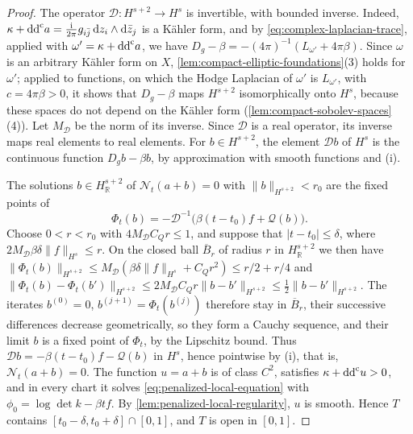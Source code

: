 \begin{proof}
The operator $\mathcal D\colon H^{s+2}\to H^s$ is invertible, with bounded inverse. Indeed, $\kappa+\mathrm{dd}^{\mathrm{c}} a=\frac{\mathrm i}{2\pi}g_{i\bar j}\,\mathrm dz_i\wedge\mathrm d\bar z_j$ is a K\"ahler form, and by \eqref{eq:complex-laplacian-trace}, applied with $\omega'=\kappa+\mathrm{dd}^{\mathrm{c}} a$, we have $D_g-\beta=-(4\pi)^{-1}(L_{\omega'}+4\pi\beta)$. Since $\omega$ is an arbitrary K\"ahler form on $X$, \cref{lem:compact-elliptic-foundations}(3) holds for $\omega'$; applied to functions, on which the Hodge Laplacian of $\omega'$ is $L_{\omega'}$, with $c=4\pi\beta>0$, it shows that $D_g-\beta$ maps $H^{s+2}$ isomorphically onto $H^s$, because these spaces do not depend on the K\"ahler form (\cref{lem:compact-sobolev-spaces}(4)). Let $M_{\mathcal D}$ be the norm of its inverse. Since $\mathcal D$ is a real operator, its inverse maps real elements to real elements. For $b\in H^{s+2}$, the element $\mathcal Db$ of $H^s$ is the continuous function $D_gb-\beta b$, by approximation with smooth functions and (i).

The solutions $b\in H^{s+2}_{\mathbb R}$ of $\mathcal N_t(a+b)=0$ with $\|b\|_{H^{s+2}}<r_0$ are the fixed points of
\[
 \Phi_t(b)=-\mathcal D^{-1}\bigl(\beta(t-t_0)f+\mathcal Q(b)\bigr).
\]
Choose $0<r<r_0$ with $4M_{\mathcal D}C_Qr\leq1$, and suppose that $|t-t_0|\leq\delta$, where $2M_{\mathcal D}\beta\delta\|f\|_{H^s}\leq r$. On the closed ball $\overline B_r$ of radius $r$ in $H^{s+2}_{\mathbb R}$ we then have $\|\Phi_t(b)\|_{H^{s+2}}\leq M_{\mathcal D}(\beta\delta\|f\|_{H^s}+C_Qr^2)\leq r/2+r/4$ and $\|\Phi_t(b)-\Phi_t(b')\|_{H^{s+2}}\leq2M_{\mathcal D}C_Qr\|b-b'\|_{H^{s+2}}\leq\frac12\|b-b'\|_{H^{s+2}}$. The iterates $b^{(0)}=0$, $b^{(j+1)}=\Phi_t(b^{(j)})$ therefore stay in $\overline B_r$, their successive differences decrease geometrically, so they form a Cauchy sequence, and their limit $b$ is a fixed point of $\Phi_t$, by the Lipschitz bound. Thus $\mathcal Db=-\beta(t-t_0)f-\mathcal Q(b)$ in $H^s$, hence pointwise by (i), that is, $\mathcal N_t(a+b)=0$. The function $u=a+b$ is of class $C^2$, satisfies $\kappa+\mathrm{dd}^{\mathrm{c}} u>0$, and in every chart it solves \eqref{eq:penalized-local-equation} with $\phi_0=\log\det k-\beta tf$. By \cref{lem:penalized-local-regularity}, $u$ is smooth. Hence $T$ contains $[t_0-\delta,t_0+\delta]\cap[0,1]$, and $T$ is open in $[0,1]$.


\end{proof}
